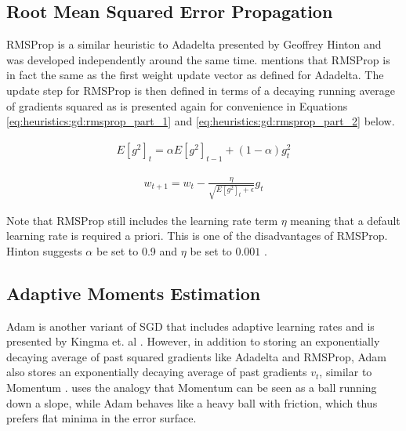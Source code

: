 \subsection{Root Mean Squared Error Propagation}
\label{sec:heuristics:rmsprop}

\Ac{RMSProp} is a similar heuristic to \ac{Adadelta} presented by Geoffrey Hinton \cite{ref:hinton:2012} and was developed independently around the same time. \citeauthor{ref:ruder:2016}\cite{ref:ruder:2016} mentions that \ac{RMSProp} is in fact the same as the first weight update vector as defined for \ac{Adadelta}. The update step for \ac{RMSProp} is then defined in terms of a decaying running average of gradients squared as is presented again for convenience in Equations \ref{eq:heuristics:gd:rmsprop_part_1} and \ref{eq:heuristics:gd:rmsprop_part_2} below.


\begin{equation}
      \label{eq:heuristics:gd:rmsprop_part_1}
      \begin{split}
            E[g^{2}]_{t} = \alpha E[g^{2}]_{t - 1} + (1 - \alpha)g_{t}^{2}
      \end{split}
\end{equation}

\begin{equation}
      \label{eq:heuristics:gd:rmsprop_part_2}
      \begin{split}
            w_{t+1} = w_{t} - \frac{\eta}{\sqrt{E[g^{2}]_{t} + \epsilon}} g_{t}
      \end{split}
\end{equation}

Note that \ac{RMSProp} still includes the learning rate term $\eta$ meaning that a default learning rate is required a priori. This is one of the disadvantages of \ac{RMSProp}. Hinton suggests $\alpha$ be set to 0.9 and $\eta$ be set to $0.001$ \cite{ref:hinton:2012}.


\subsection{Adaptive Moments Estimation}
\label{sec:heuristics:adam}

\Ac{Adam} is another variant of \ac{SGD} that includes adaptive learning rates and is presented by Kingma et. al \cite{ref:kingma:2014}. However, in addition to storing an exponentially decaying average of past squared gradients like \ac{Adadelta} and \ac{RMSProp}, \ac{Adam} also stores an exponentially decaying average of past gradients $v_{t}$, similar to \ac{Momentum} \cite{ref:ruder:2016}. \citeauthor{ref:heusel:2017} \cite{ref:heusel:2017} uses the analogy that \ac{Momentum} can be seen as a ball running down a slope, while \ac{Adam} behaves like a heavy ball with friction, which thus prefers flat minima in the error surface.

